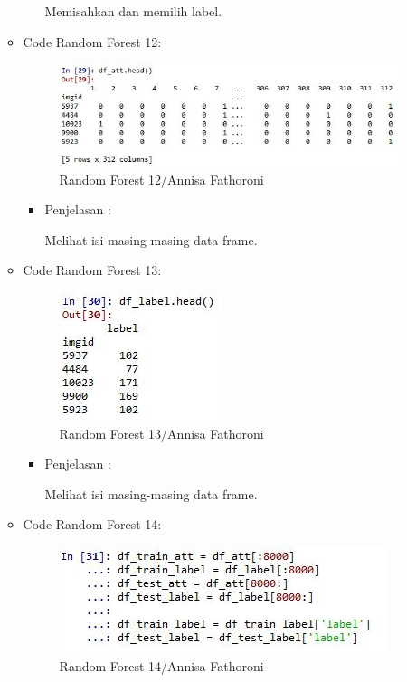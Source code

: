 \begin{enumerate}
\begin{itemize}
\begin{itemize}
Memisahkan dan memilih label.

\end{itemize}
\item Code Random Forest 12:

\begin{figure}[ht]
\centering
\includegraphics[scale=0.6]{figures/Chapter3AnnisaFathoroni21.jpg}
\caption{Random Forest 12/Annisa Fathoroni}
\label{contoh}
\end{figure}

\begin{itemize}
\item Penjelasan :

Melihat isi masing-masing data frame.

\end{itemize}
\item Code Random Forest 13:

\begin{figure}[ht]
\centering
\includegraphics[scale=0.6]{figures/Chapter3AnnisaFathoroni22.jpg}
\caption{Random Forest 13/Annisa Fathoroni}
\label{contoh}
\end{figure}

\begin{itemize}
\item Penjelasan :

Melihat isi masing-masing data frame.

\end{itemize}
\item Code Random Forest 14:

\begin{figure}[ht]
\centering
\includegraphics[scale=0.6]{figures/Chapter3AnnisaFathoroni23.jpg}
\caption{Random Forest 14/Annisa Fathoroni}
\label{contoh}
\end{figure}


\end{itemize}
\end{enumerate}
